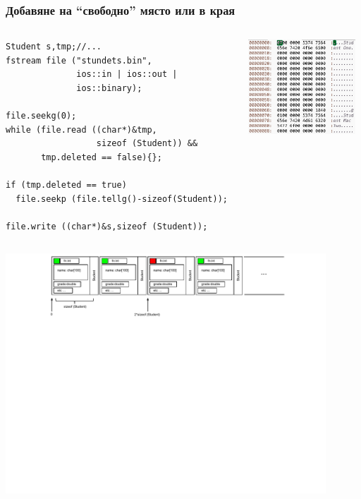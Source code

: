 \documentclass{beamer}
\begin{document}
\begin{frame}[fragile]
\frametitle{Добавяне на ``свободно'' място или в края}

\vspace{-20px}



\begin{columns}[t]
  \begin{column}{0.65\textwidth}

\begin{flushleft}
\begin{lstlisting}
Student s,tmp;//...
fstream file ("stundets.bin", 
              ios::in | ios::out | 
              ios::binary);

file.seekg(0);
while (file.read ((char*)&tmp, 
                  sizeof (Student)) &&
       tmp.deleted == false){};

if (tmp.deleted == true)
  file.seekp (file.tellg()-sizeof(Student));

file.write ((char*)&s,sizeof (Student));
\end{lstlisting}
\end{flushleft}   


  \end{column}
  \begin{column}{0.35\textwidth}
\begin{flushright}
  \includegraphics[width=4.0cm]{images/binfiless}
\end{flushright}

  \end{column}
\end{columns}

\includegraphics[width=12cm]{images/binfileflag}


\end{frame}
\end{document}
